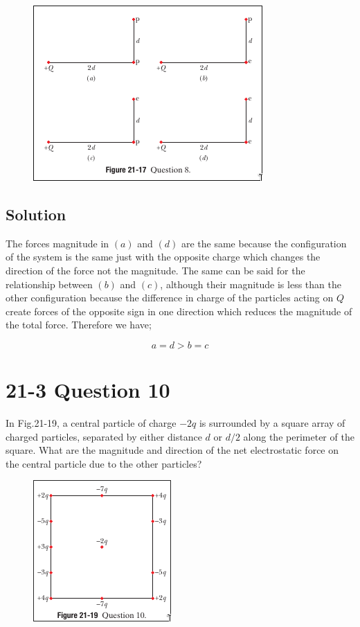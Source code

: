 \documentclass{article}
\begin{document}
\begin{figure}[ht]
    \centering
    \includegraphics[scale=0.75]{image-2.png}
\end{figure}

\subsection*{Solution}
The forces magnitude in $(a)$ and $(d)$ are the same because the configuration of the system is the same just with the opposite charge which changes the direction of the force not the magnitude.
The same can be said for the relationship between $(b)$ and $(c)$, although their magnitude is less than the other configuration because the difference in charge of the particles acting on $Q$ create forces of the opposite sign in one direction which reduces the magnitude of the total force.
Therefore we have; 

\[
    \boxed{a = d > b = c}
\]

\section*{21-3 Question 10}
In Fig.21-19, a central particle of charge $-2q$ is surrounded by a square array of charged particles, separated by either distance $d$ or $d/2$ along the perimeter of the square.
What are the magnitude and direction of the net electrostatic force on the central particle due to the other particles?

\begin{figure}[ht]
    \centering
    \includegraphics[scale=0.75]{image-3.png}
\end{figure}
\end{document}
